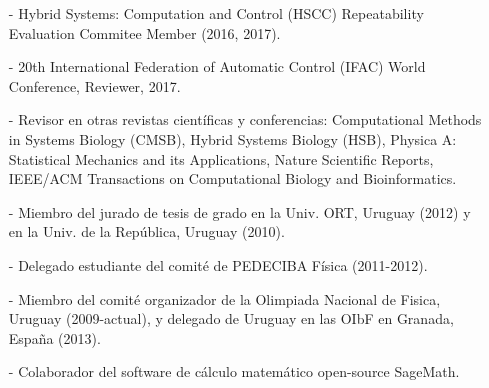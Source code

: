 \documentclass[10pt]{article}
\renewcommand{\section}[2]%
        {\pagebreak[2]\vspace{1.3\baselineskip}%
         \phantomsection\addcontentsline{toc}{section}{#1}%
         \hspace{0in}%
         \marginpar{
         \raggedright \scshape #1}#2}
\begin{document}
\vspace{-0.75cm}

\begin{itemize}
\item[-] Hybrid Systems: Computation and Control (HSCC) Repeatability Evaluation Commitee Member (2016, 2017).
\item[-] 20th International Federation of Automatic Control
(IFAC) World Conference, Reviewer, 2017. 
\item[-] Revisor en otras revistas científicas y conferencias: Computational Methods in Systems Biology (CMSB), Hybrid Systems Biology (HSB), Physica A: Statistical Mechanics and its Applications, Nature Scientific Reports, IEEE/ACM Transactions on Computational Biology and Bioinformatics.
\item[-] Miembro del jurado de tesis de grado en la Univ. ORT, Uruguay (2012) y en la Univ. de la Rep\'{u}blica, Uruguay (2010). 
\item[-] Delegado estudiante del comit\'e de PEDECIBA F\'isica (2011-2012).
\item[-] Miembro del comit\'e organizador de la Olimpiada Nacional de Fisica, Uruguay (2009-actual), y delegado de Uruguay en las OIbF en Granada, España (2013).
\item[-] Colaborador del software de cálculo matemático open-source SageMath. 
\end{itemize}

%

%
%


 

%
\end{document}
